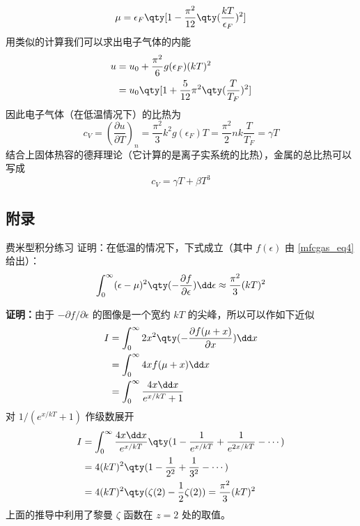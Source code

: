 \begin{equation}
\mu=\epsilon_F\qty[1-\frac{\pi^2}{12}\qty(\frac{kT}{\epsilon_F})^2]
\end{equation}
用类似的计算我们可以求出电子气体的内能
\begin{equation}
\begin{aligned}
u&=u_0+\frac{\pi^2}{6}g(\epsilon_F)(kT)^2\\
&=u_0\qty[1+\frac{5}{12}\pi^2\qty(\frac{T}{T_F})^2]
\end{aligned}
\end{equation}
因此电子气体（在低温情况下）的比热为
\begin{equation}
c_V=\left(\frac{\partial u}{\partial T}\right)_n=\frac{\pi^2}{3}k^2 g(\epsilon_F) T =\frac{\pi^2}{2}nk\frac{T}{T_F}= \gamma T
\end{equation}
结合上固体热容的德拜理论（它计算的是离子实系统的比热），金属的总比热可以写成
\begin{equation}
c_V=\gamma T+\beta T^3
\end{equation}
\subsection{附录}
\begin{lemma}{费米型积分练习}\label{mfcgas_lem1}
证明：在低温的情况下，下式成立（其中 $f(\epsilon)$ 由 \autoref{mfcgas_eq4} 给出）：
\begin{equation}
\int_0^\infty (\epsilon-\mu)^2 \qty(-\frac{\partial f}{\partial \epsilon})\dd\epsilon
\approx\frac{\pi^2}{3}(kT)^2
\end{equation}


\textbf{证明：}由于 $-\partial f/\partial \epsilon$ 的图像是一个宽约 $k T$ 的尖峰，所以可以作如下近似
\begin{equation}
\begin{aligned}
I&=\int_0^\infty 2x^2 \qty(-\frac{\partial f(\mu+x)}{\partial x}) \dd x\\
&=\int_0^\infty 4x f(\mu+x) \dd x\\
&=\int_0^\infty \frac{4x\dd x}{e^{x/kT}+1}
\end{aligned}
\end{equation}
对 $1/(e^{x/kT}+1)$ 作级数展开
\begin{equation}
\begin{aligned}
I&=\int_0^\infty \frac{4x\dd x}{e^{x/kT}}\qty(1-\frac{1}{e^{x/kT}}+\frac{1}{e^{2x/kT}}-\cdots)\\
&=4(kT)^2 \qty(1-\frac{1}{2^2}+\frac{1}{3^2}-\cdots)\\
&=4(kT)^2 \qty(\zeta(2)-\frac{1}{2}\zeta(2))=\frac{\pi^2}{3}(kT)^2
\end{aligned}
\end{equation}
上面的推导中利用了黎曼 $\zeta$ 函数在 $z=2$ 处的取值。
\end{lemma}
